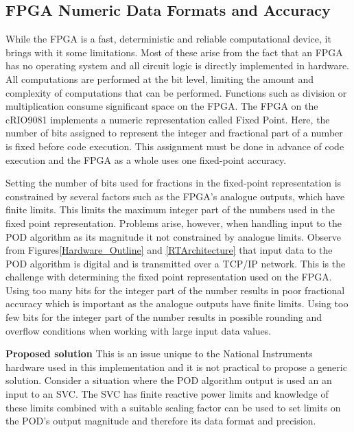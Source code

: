 \documentclass{ieeeaccess}
\begin{document}
\subsection{FPGA Numeric Data Formats and Accuracy}

While the FPGA is a fast, deterministic and reliable computational device, it brings with it some limitations. Most of these arise from the fact that an FPGA has no operating system and all circuit logic is directly implemented in hardware. All computations are performed at the bit level, limiting the amount and complexity of computations that can be performed. Functions such as division or multiplication consume significant space on the FPGA\cite{LabViewManuals}. The FPGA on the cRIO9081 implements a numeric representation called Fixed Point\cite{LabViewManuals}. Here, the number of bits assigned to represent the integer and fractional part of a number is fixed before code execution\cite{LabViewManuals}. This assignment must be done in advance of code execution and the FPGA as a whole uses one fixed-point accuracy.

Setting the number of bits used for fractions in the fixed-point representation is constrained by several factors such as the FPGA\rq{s} analogue outputs, which have finite limits. This limits the maximum integer part of the numbers used in the fixed point representation. Problems arise, however, when handling input to the POD algorithm as its magnitude it not constrained by analogue limits. Observe from Figures\ref{Hardware_Outline} and \ref{RTArchitecture} that input data to the POD algorithm is digital and is transmitted over a TCP/IP network. This is the challenge with determining the fixed point representation used on the FPGA. Using too many bits for the integer part of the number results in poor fractional accuracy which is important as the analogue outputs have finite limits. Using too few bits for the integer part of the number results in possible rounding and overflow conditions when working with large input data values.

\textbf{Proposed solution} This is an issue unique to the National Instruments hardware used in this implementation and it is not practical to propose a generic solution. Consider a situation where the POD algorithm output is used an an input to an SVC. The SVC has finite reactive power limits and knowledge of these limits combined with a suitable scaling factor can be used to set limits on the POD's output magnitude and therefore its data format and precision.
\end{document}
